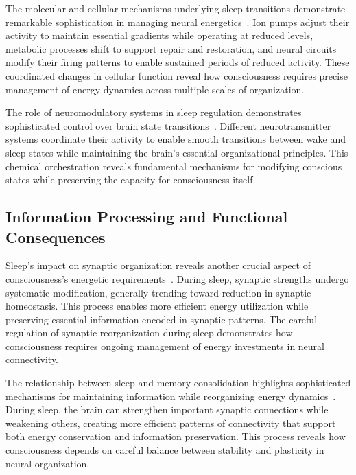 The molecular and cellular mechanisms underlying sleep transitions demonstrate remarkable sophistication in managing neural energetics~\cite{kukushkin2024massed}. Ion pumps adjust their activity to maintain essential gradients while operating at reduced levels, metabolic processes shift to support repair and restoration, and neural circuits modify their firing patterns to enable sustained periods of reduced activity. These coordinated changes in cellular function reveal how consciousness requires precise management of energy dynamics across multiple scales of organization.

The role of neuromodulatory systems in sleep regulation demonstrates sophisticated control over brain state transitions~\cite{amil2024theta}. Different neurotransmitter systems coordinate their activity to enable smooth transitions between wake and sleep states while maintaining the brain's essential organizational principles. This chemical orchestration reveals fundamental mechanisms for modifying conscious states while preserving the capacity for consciousness itself.

\subsection*{Information Processing and Functional Consequences}

Sleep's impact on synaptic organization reveals another crucial aspect of consciousness's energetic requirements~\cite{Bicknell2021}. During sleep, synaptic strengths undergo systematic modification, generally trending toward reduction in synaptic homeostasis. This process enables more efficient energy utilization while preserving essential information encoded in synaptic patterns. The careful regulation of synaptic reorganization during sleep demonstrates how consciousness requires ongoing management of energy investments in neural connectivity.

The relationship between sleep and memory consolidation highlights sophisticated mechanisms for maintaining information while reorganizing energy dynamics~\cite{pinotsis2023vivo}. During sleep, the brain can strengthen important synaptic connections while weakening others, creating more efficient patterns of connectivity that support both energy conservation and information preservation. This process reveals how consciousness depends on careful balance between stability and plasticity in neural organization.

